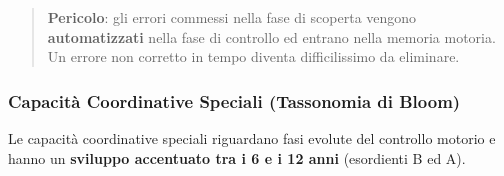 \documentclass[a4paper,11pt]{article}
\begin{document}
\begin{quote}
      \textbf{Pericolo}: gli errori commessi nella fase di scoperta vengono
      \textbf{automatizzati} nella fase di controllo ed entrano nella memoria
      motoria. Un errore non corretto in tempo diventa difficilissimo da
      eliminare.
\end{quote}

\subsubsection{Capacità Coordinative Speciali (Tassonomia di
      Bloom)}\label{capacituxe0-coordinative-speciali-tassonomia-di-bloom}

Le capacità coordinative speciali riguardano fasi evolute del controllo
motorio e hanno un \textbf{sviluppo accentuato tra i 6 e i 12 anni}
(esordienti B ed A).
\end{document}
